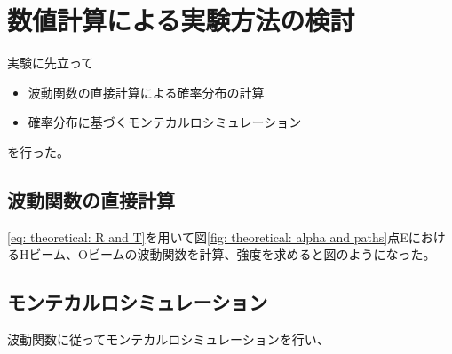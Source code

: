\documentclass[dvipdfmx]{jsarticle}
\begin{document}
\section{数値計算による実験方法の検討}

実験に先立って
\begin{itemize}
    \item 波動関数の直接計算による確率分布の計算
    \item 確率分布に基づくモンテカルロシミュレーション
\end{itemize}
を行った。



\subsection{波動関数の直接計算}

\eqref{eq: theoretical: R and T}を用いて図\ref{fig: theoretical: alpha and paths}点EにおけるHビーム、Oビームの波動関数を計算、強度を求めると図のようになった。


\subsection{モンテカルロシミュレーション}

波動関数に従ってモンテカルロシミュレーションを行い、
\end{document}
